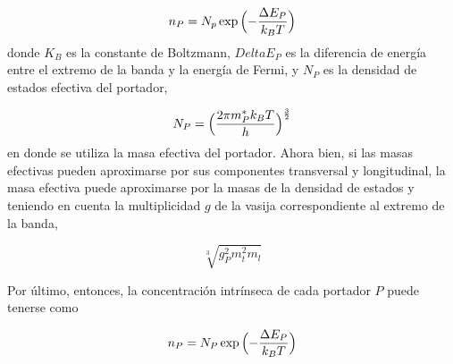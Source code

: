 \begin{equation}\label{EqPortadoresT}
  n_P = N_p \exp {\Bigl( -\frac{\Delta E_P}{k_B T} \Bigr)}
\end{equation}
donde $K_B$ es la constante de Boltzmann, $Delta E_P$ es la diferencia de energía 
entre el extremo de la banda y la energía de Fermi, y  $N_P$ es la densidad de
estados efectiva del portador, 

\begin{equation}\label{EqCarrEffDens}
  N_P = \Bigl( \frac{2 \pi m_{P}^{*} k_B T }{h} \Bigr)^{\frac{3}{2}}
\end{equation}
en donde se utiliza la masa efectiva del portador. Ahora bien, si las masas efectivas 
pueden 
aproximarse por sus componentes transversal y longitudinal, la masa efectiva 
puede aproximarse por la masas de la densidad de estados y teniendo en cuenta la 
multiplicidad $g$ de la vasija correspondiente al extremo de la banda, 

\begin{equation}\label{EqDOSEffMass}
  \sqrt[3]{g_P^2 m_t ^2 m_l}
\end{equation}

Por último, entonces, la concentración intrínseca de cada portador $P$ puede tenerse como

\begin{equation}\label{EqFullCarrierConcentration}
  n_P = N_P \exp{ \Bigl( -\frac{\Delta E_P}{k_B T} \Bigr) } 
\end{equation}

